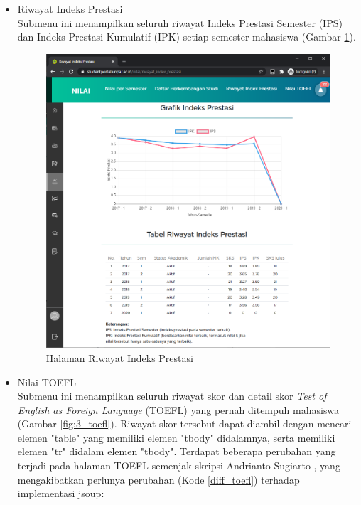 \begin{itemize}
        \item Riwayat Indeks Prestasi\\
       Submenu ini menampilkan seluruh riwayat Indeks Prestasi Semester (IPS) dan Indeks Prestasi Kumulatif (IPK) setiap semester mahasiswa (Gambar \ref{fig:3_rip}).
       
       \begin{figure}[H]
        	\centering
        	\includegraphics[scale=0.45]{Gambar/nilai_rip.png}
        	\caption{Halaman Riwayat Indeks Prestasi} 
        	\label{fig:3_rip}
        \end{figure}
        
        \item Nilai TOEFL\\
       Submenu ini menampilkan seluruh riwayat skor dan detail skor \textit{Test of English as Foreign Language} (TOEFL) yang pernah ditempuh mahasiswa (Gambar \ref{fig:3_toefl}). Riwayat skor tersebut dapat diambil dengan mencari elemen "table" yang memiliki elemen "tbody" didalamnya, serta memiliki elemen "tr" didalam elemen "tbody".
       Terdapat beberapa perubahan yang terjadi pada halaman TOEFL semenjak skripsi Andrianto Sugiarto \cite{ifstupor}, yang mengakibatkan perlunya perubahan (Kode \ref{diff_toefl}) terhadap implementasi jsoup:


\end{itemize}
